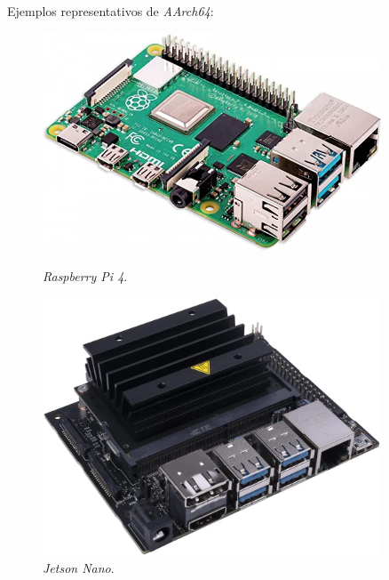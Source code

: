 Ejemplos representativos de \textit{AArch64}:
\begin{figure} [h!]
	\begin{center}
		\begin{minipage}{0.45\textwidth}
			\begin{center}
				\includegraphics[width=0.9\textwidth]{figs/raspberrypi}
			\end{center}
			\caption{\textit{Raspberry Pi 4}.}
		\end{minipage}\hfill
		\begin{minipage}{0.45\textwidth}
			\begin{center}
				\includegraphics[width=0.9\textwidth]{figs/jetsonnano}
			\end{center}
			\caption{\textit{Jetson Nano}.}
		\end{minipage}
	\end{center}
	\label{fig:aarch64}
\end{figure}\

